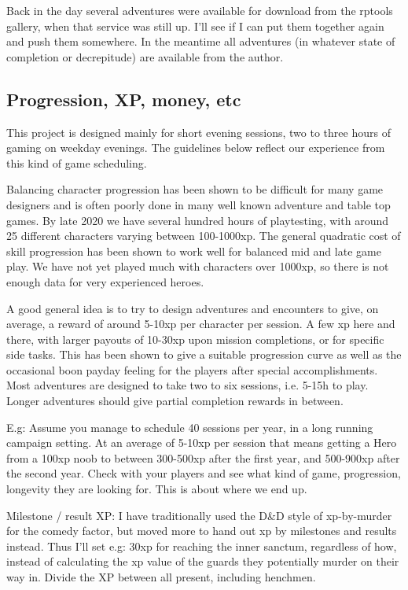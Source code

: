 Back in the day several adventures were available for download from the rptools gallery, when that service was still up. I'll see if I can put them together again and push them somewhere. In the meantime all adventures (in whatever state of completion or decrepitude) are available from the author.


\subsection*{Progression, XP, money, etc}
This project is designed mainly for short evening sessions, two to three hours of gaming on weekday evenings. The guidelines below reflect our experience from this kind of game scheduling.

Balancing character progression has been shown to be difficult for many game designers and is often poorly done in many well known adventure and table top games. By late 2020 we have several hundred hours of playtesting, with around 25 different characters varying between 100-1000xp. The general quadratic cost of skill progression has been shown to work well for balanced mid and late game play. We have not yet played much with characters over 1000xp, so there is not enough data for very experienced heroes.

A good general idea is to try to design adventures and encounters to give, on average, a reward of around 5-10xp per character per session. A few xp here and there, with larger payouts of 10-30xp upon mission completions, or for specific side tasks. This has been shown to give a suitable progression curve as well as the occasional boon payday feeling for the players after special accomplishments.
Most adventures are designed to take two to six sessions, i.e. 5-15h to play. Longer adventures should give partial completion rewards in between.

E.g: Assume you manage to schedule 40 sessions per year, in a long running campaign setting. At an average of 5-10xp per session that means getting a Hero from a 100xp noob to between 300-500xp after the first year, and 500-900xp after the second year. Check with your players and see what kind of game, progression, longevity they are looking for. This is about where we end up.

Milestone / result XP:
I have traditionally used the D\&D style of xp-by-murder for the comedy factor, but moved more to hand out xp by milestones and results instead. Thus I'll set e.g: 30xp for reaching the inner sanctum, regardless of how, instead of calculating the xp value of the guards they potentially murder on their way in.
Divide the XP between all present, including henchmen.


